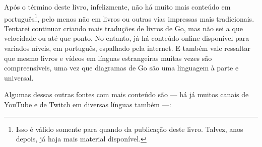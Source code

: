 \bigskip
\bigskip

Após o término deste livro, infelizmente, não há muito mais conteúdo em português\footnote{Isso é válido somente para quando da publicação deste livro. Talvez, anos depois, já haja mais material disponível.}, pelo menos não em livros ou outras vias impressas mais tradicionais. Tentarei continuar criando mais traduções de livros de Go, mas não sei a que velocidade ou até que ponto. No entanto, já há conteúdo online disponível para variados níveis, em português, espalhado pela internet. E também vale ressaltar que mesmo livros e vídeos em línguas estrangeiras muitas vezes são compreensíveis, uma vez que diagramas de Go são uma linguagem à parte e universal.

Algumas dessas outras fontes com mais conteúdo são --- há já muitos canais de YouTube e de Twitch em diversas línguas também ---:

